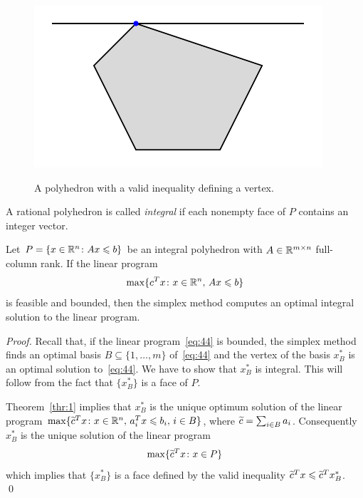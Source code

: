\begin{figure}[htbp]
  \begin{center}{
   \includegraphics{./figures/IntProg2.pdf}
    }    
  \end{center}
  \caption{A polyhedron with a valid inequality defining a vertex. }
  \label{fig:3}
\end{figure}




\begin{definition}
  \label{def:12}  
  A rational polyhedron   is called \emph{integral} 
  if  each nonempty face of $P$ contains an integer vector. 
\end{definition}



\begin{lemma}
  \label{lem:9}
  Let $P = \{ x \in \mathbb{R}^n \colon Ax\leqslant b\}$ be an integral polyhedron with $A
  \in \mathbb{R}^{m\times n}$ full-column rank. If the linear program 
  \begin{equation}
    \label{eq:44}
    \max\{c^Tx \colon x \in \mathbb{R}^n, \, Ax\leqslant b\}
  \end{equation}
  is feasible and bounded, then the simplex method computes an optimal
  integral solution to the linear program. 
\end{lemma}


\begin{proof}
  Recall that, if the linear program~\eqref{eq:44} is bounded, the simplex method finds an optimal basis $B
  \subseteq\{1,\ldots,m\}$ of~\eqref{eq:44} and the vertex of the basis $x^*_B$ is
  an optimal solution to~\eqref{eq:44}. We have to
  show that $x^*_B$ is integral. This will follow from the fact that
  $\{x^*_B\}$ is a face of $P$.

  Theorem~\ref{thr:1} implies that $x^*_B$ is the unique optimum
  solution of the linear program $\max\{\widetilde{c}^T x \colon x \in 
  \mathbb{R}^n, \,
  a_i^Tx \leqslant b_i, \, i \in B\}$, where $\widetilde{c} = \sum_{i \in B} a_i$.
  Consequently $x^*_B$ is the unique solution of the linear program
  \begin{displaymath}
    \max\{\widetilde{c}^Tx \colon x \in P\}
  \end{displaymath}
  which implies that $\{x^*_B\}$ is a face defined by the valid
  inequality $\widetilde{c}^Tx \leqslant \widetilde{c}^Tx^*_B$.  \qed 
\end{proof}


